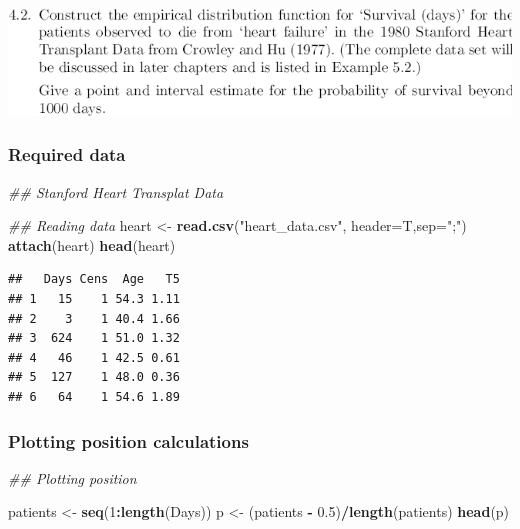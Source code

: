\documentclass[
]{article}
\newenvironment{Shaded}{\begin{snugshade}}{\end{snugshade}}
\newcommand{\CommentTok}[1]{\textcolor[rgb]{0.56,0.35,0.01}{\textit{#1}}}
\newcommand{\DataTypeTok}[1]{\textcolor[rgb]{0.13,0.29,0.53}{#1}}
\newcommand{\DecValTok}[1]{\textcolor[rgb]{0.00,0.00,0.81}{#1}}
\newcommand{\FloatTok}[1]{\textcolor[rgb]{0.00,0.00,0.81}{#1}}
\newcommand{\KeywordTok}[1]{\textcolor[rgb]{0.13,0.29,0.53}{\textbf{#1}}}
\newcommand{\NormalTok}[1]{#1}
\newcommand{\OperatorTok}[1]{\textcolor[rgb]{0.81,0.36,0.00}{\textbf{#1}}}
\newcommand{\StringTok}[1]{\textcolor[rgb]{0.31,0.60,0.02}{#1}}
\begin{document}
\includegraphics[width=9.08in]{4_2}

\hypertarget{required-data-1}{%
\subsubsection{Required data}\label{required-data-1}}

\begin{Shaded}
\begin{Highlighting}[]
\CommentTok{## Stanford Heart Transplat Data}

\CommentTok{## Reading data}
\NormalTok{heart <-}\StringTok{ }\KeywordTok{read.csv}\NormalTok{(}\StringTok{"heart_data.csv"}\NormalTok{, }\DataTypeTok{header=}\NormalTok{T,}\DataTypeTok{sep=}\StringTok{";"}\NormalTok{)}
\KeywordTok{attach}\NormalTok{(heart)}
\KeywordTok{head}\NormalTok{(heart)}
\end{Highlighting}
\end{Shaded}

\begin{verbatim}
##   Days Cens  Age   T5
## 1   15    1 54.3 1.11
## 2    3    1 40.4 1.66
## 3  624    1 51.0 1.32
## 4   46    1 42.5 0.61
## 5  127    1 48.0 0.36
## 6   64    1 54.6 1.89
\end{verbatim}

\hypertarget{plotting-position-calculations-1}{%
\subsubsection{Plotting position
calculations}\label{plotting-position-calculations-1}}

\begin{Shaded}
\begin{Highlighting}[]
\CommentTok{## Plotting position}

\NormalTok{patients <-}\StringTok{ }\KeywordTok{seq}\NormalTok{(}\DecValTok{1}\OperatorTok{:}\KeywordTok{length}\NormalTok{(Days))}
\NormalTok{p <-}\StringTok{ }\NormalTok{(patients }\OperatorTok{-}\StringTok{ }\FloatTok{0.5}\NormalTok{)}\OperatorTok{/}\KeywordTok{length}\NormalTok{(patients)}
\KeywordTok{head}\NormalTok{(p)}
\end{Highlighting}
\end{Shaded}
\end{document}
